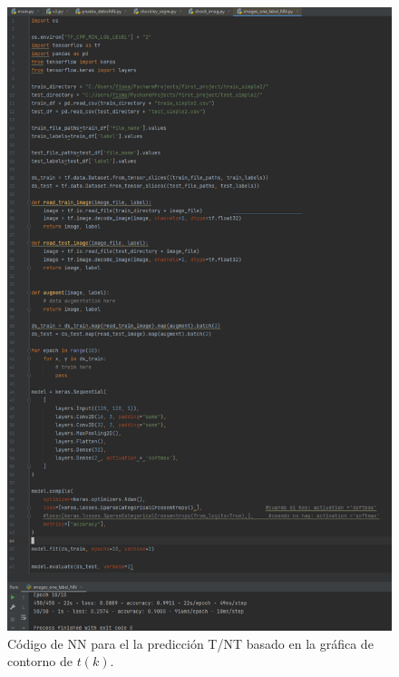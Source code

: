 \documentclass{article}
\begin{document}
\begin{figure}[th!]
\centering
   \includegraphics[width=1.\textwidth]{prog_imagenes_shockley.png}
   \caption{Código de NN para el la predicción T/NT basado en la gráfica de contorno de $t(k)$.}
\end{figure}
\end{document}

